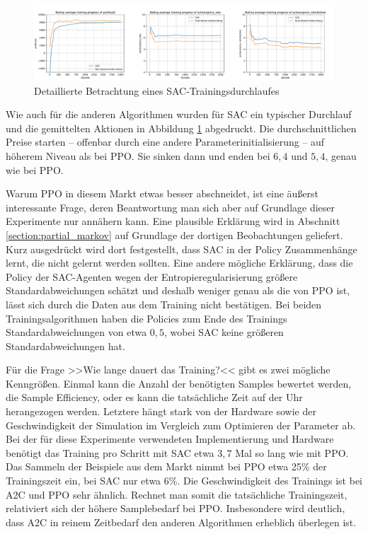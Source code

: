 \begin{figure}[htb]
	\centering
	\includegraphics[width=\textwidth]{main/sac_detailed_analysis.pdf}
	\caption{Detaillierte Betrachtung eines SAC-Trainingsdurchlaufes}
	\label{graphic:SACDetails}
\end{figure}

Wie auch für die anderen Algorithmen wurden für SAC ein typischer Durchlauf und die gemittelten Aktionen in Abbildung \ref{graphic:SACDetails} abgedruckt.
Die durchschnittlichen Preise starten -- offenbar durch eine andere Parameterinitialisierung -- auf höherem Niveau als bei PPO.
Sie sinken dann und enden bei $6{,}4$ und $5{,}4$, genau wie bei PPO.

Warum PPO in diesem Markt etwas besser abschneidet, ist eine äußerst interessante Frage, deren Beantwortung man sich aber auf Grundlage dieser Experimente nur annähern kann.
Eine plausible Erklärung wird in Abschnitt \ref{section:partial_markov} auf Grundlage der dortigen Beobachtungen geliefert.
Kurz ausgedrückt wird dort festgestellt, dass SAC in der Policy Zusammenhänge lernt, die nicht gelernt werden sollten.
Eine andere mögliche Erklärung, dass die Policy der SAC-Agenten wegen der Entropieregularisierung größere Standardabweichungen schätzt und deshalb weniger genau als die von PPO ist, lässt sich durch die Daten aus dem Training nicht bestätigen.
Bei beiden Trainingsalgorithmen haben die Policies zum Ende des Trainings Standardabweichungen von etwa $0{,}5$, wobei SAC keine größeren Standardabweichungen hat.

Für die Frage >>Wie lange dauert das Training?<< gibt es zwei mögliche Kenngrößen.
Einmal kann die Anzahl der benötigten Samples bewertet werden, die Sample Efficiency, oder es kann die tatsächliche Zeit auf der Uhr herangezogen werden.
Letztere hängt stark von der Hardware sowie der Geschwindigkeit der Simulation im Vergleich zum Optimieren der Parameter ab.
Bei der für diese Experimente verwendeten Implementierung und Hardware benötigt das Training pro Schritt mit SAC etwa $3,7$ Mal so lang wie mit PPO.
Das Sammeln der Beispiele aus dem Markt nimmt bei PPO etwa 25\% der Trainingszeit ein, bei SAC nur etwa 6\%.
Die Geschwindigkeit des Trainings ist bei A2C und PPO sehr ähnlich.
Rechnet man somit die tatsächliche Trainingszeit, relativiert sich der höhere Samplebedarf bei PPO.
Insbesondere wird deutlich, dass A2C in reinem Zeitbedarf den anderen Algorithmen erheblich überlegen ist.

